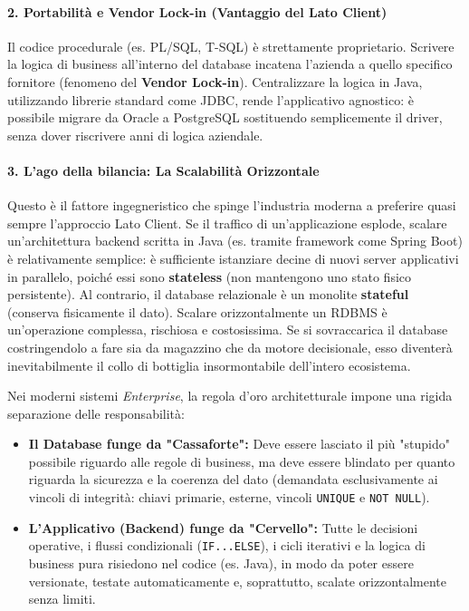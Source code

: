 \paragraph{2. Portabilità e Vendor Lock-in (Vantaggio del Lato Client)}
Il codice procedurale (es. PL/SQL, T-SQL) è strettamente proprietario. Scrivere la logica di business all'interno del database incatena l'azienda a quello specifico fornitore (fenomeno del \textbf{Vendor Lock-in}). Centralizzare la logica in Java, utilizzando librerie standard come JDBC, rende l'applicativo agnostico: è possibile migrare da Oracle a PostgreSQL sostituendo semplicemente il driver, senza dover riscrivere anni di logica aziendale.

\paragraph{3. L'ago della bilancia: La Scalabilità Orizzontale}
Questo è il fattore ingegneristico che spinge l'industria moderna a preferire quasi sempre l'approccio Lato Client. 
Se il traffico di un'applicazione esplode, scalare un'architettura backend scritta in Java (es. tramite framework come Spring Boot) è relativamente semplice: è sufficiente istanziare decine di nuovi server applicativi in parallelo, poiché essi sono \textbf{stateless} (non mantengono uno stato fisico persistente). 
Al contrario, il database relazionale è un monolite \textbf{stateful} (conserva fisicamente il dato). Scalare orizzontalmente un RDBMS è un'operazione complessa, rischiosa e costosissima. Se si sovraccarica il database costringendolo a fare sia da magazzino che da motore decisionale, esso diventerà inevitabilmente il collo di bottiglia insormontabile dell'intero ecosistema.

\begin{bestpractice}
Nei moderni sistemi \textit{Enterprise}, la regola d'oro architetturale impone una rigida separazione delle responsabilità:
\begin{itemize}
    \item \textbf{Il Database funge da "Cassaforte":} Deve essere lasciato il più "stupido" possibile riguardo alle regole di business, ma deve essere blindato per quanto riguarda la sicurezza e la coerenza del dato (demandata esclusivamente ai vincoli di integrità: chiavi primarie, esterne, vincoli \texttt{UNIQUE} e \texttt{NOT NULL}).
    \item \textbf{L'Applicativo (Backend) funge da "Cervello":} Tutte le decisioni operative, i flussi condizionali (\texttt{IF...ELSE}), i cicli iterativi e la logica di business pura risiedono nel codice (es. Java), in modo da poter essere versionate, testate automaticamente e, soprattutto, scalate orizzontalmente senza limiti.
\end{itemize}
\end{bestpractice}

